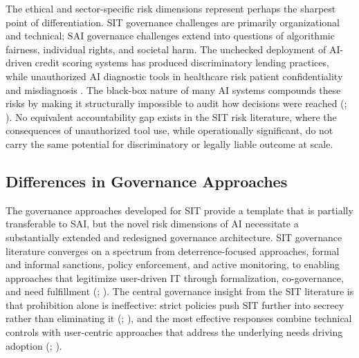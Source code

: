 \documentclass[12pt,oneside]{article}
\begin{document}
The ethical and sector-specific risk dimensions represent perhaps the sharpest point of differentiation. \ac{SIT} governance challenges are primarily organizational and technical; \ac{SAI} governance challenges extend into questions of algorithmic fairness, individual rights, and societal harm. The unchecked deployment of \ac{AI}-driven credit scoring systems has produced discriminatory lending practices, while unauthorized \ac{AI} diagnostic tools in healthcare risk patient confidentiality and misdiagnosis \citep[2, 3]{balogun2025ethical}. The black-box nature of many \ac{AI} systems compounds these risks by making it structurally impossible to audit how decisions were reached (\citealp[1]{silic2025shadow}; \citealp[4]{balogun2025ethical}). No equivalent accountability gap exists in the \ac{SIT} risk literature, where the consequences of unauthorized tool use, while operationally significant, do not carry the same potential for discriminatory or legally liable outcome at scale.

\subsection{Differences in Governance Approaches} \label{differences-in-governance-approaches}

The governance approaches developed for \ac{SIT} provide a template that is partially transferable to \ac{SAI}, but the novel risk dimensions of \ac{AI} necessitate a substantially extended and redesigned governance architecture. \ac{SIT} governance literature converges on a spectrum from deterrence-focused approaches, formal and informal sanctions, policy enforcement, and active monitoring, to enabling approaches that legitimize user-driven \ac{IT} through formalization, co-governance, and need fulfillment (\citealp[8-9]{gyoery2012exploring}; \citealp[9]{zimmermann2016governing}). The central governance insight from the \ac{SIT} literature is that prohibition alone is ineffective: strict policies push \ac{SIT} further into secrecy rather than eliminating it (\citealp[472]{haag2017shadow}; \citealp[856]{klesel2019employees}), and the most effective responses combine technical controls with user-centric approaches that address the underlying needs driving adoption (\citealp[26]{mallmann2018influence}; \citealp[14]{kopper2019shadowit}).
\end{document}
